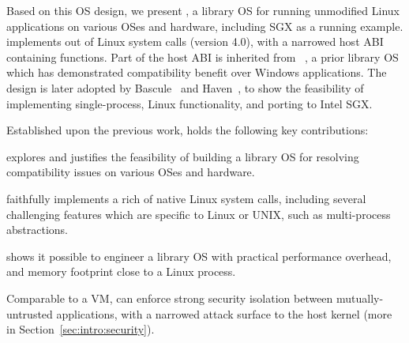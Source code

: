 Based on this OS design, we present {\bf \graphene{}}, a library OS for running unmodified Linux applications on various OSes and hardware, including SGX as a running example.
\graphene{} implements \graphenesyscalls{} out of \linuxsyscalls{} Linux system calls (version 4.0), with a narrowed host ABI containing \palcalls{} functions.
Part of the host ABI is inherited from \drawbridge{}~\cite{porter11drawbridge}, a prior library OS which has demonstrated compatibility benefit over
Windows applications.
The \drawbridge{} design is later adopted by Bascule~\cite{baumann13bascule} and Haven~\cite{baumann14haven}, to show the feasibility of implementing single-process, Linux functionality, and porting to Intel SGX.

Established upon the previous work, \graphene{} holds the following key contributions:
\begin{compactenum}
\item \graphene{} explores and justifies the feasibility of building a library OS for resolving compatibility issues on various OSes and hardware.
\item \graphene{} faithfully implements a rich of native Linux system calls, including several challenging features which are specific to Linux or UNIX,
such as multi-process abstractions.
\item \graphene{} shows it possible to engineer a library OS
with practical performance overhead,
and memory footprint close to a Linux process.
\item Comparable to a VM, \graphene{} can enforce strong security isolation
between mutually-untrusted applications,
with a narrowed attack surface to the host kernel (more in Section~\ref{sec:intro:security}).
\end{compactenum}


